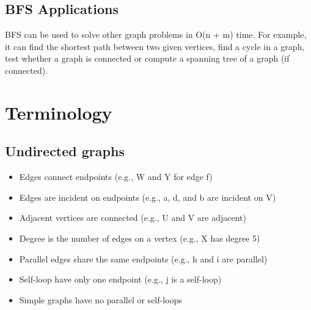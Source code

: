 \documentclass[12pt]{article}
\newcommand{\1}{\space \quad}
\newcommand{\2}{\quad \quad \quad}
\newcommand{\3}{\quad \quad \quad \quad \space}
\newcommand{\4}{\quad \quad \quad \quad \quad \quad}
\newcommand{\5}{\quad \quad \quad \quad \quad \quad \quad \space}
\begin{document}
\subsection{BFS Applications}
BFS can be used to solve other graph problems in O(n + m) time. For example, it can
find the shortest path between two given vertices, find a cycle in a graph,
test whether a graph is connected or compute a spanning tree of a graph (if connected).

\section{Terminology}

\subsection{Undirected graphs}
\begin{minipage}[l]{0.6\textwidth}
  \begin{itemize}
    \item Edges connect endpoints (e.g., W and Y for edge f)
    \item Edges are incident on endpoints (e.g., a, d, and b are incident on V)
    \item Adjacent vertices are connected (e.g., U and V are adjacent)
    \item Degree is the number of edges on a vertex (e.g., X has degree 5)
    \item Parallel edges share the same endpoints (e.g., h and i are parallel)
    \item Self-loop have only one endpoint (e.g., j is a self-loop)
    \item Simple graphs have no parallel or self-loops
  \end{itemize}
\end{minipage}
\end{document}
